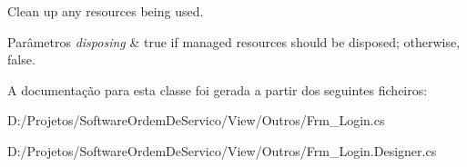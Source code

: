 Clean up any resources being used. 


\begin{DoxyParams}{Parâmetros}
{\em disposing} & true if managed resources should be disposed; otherwise, false.\\
\hline
\end{DoxyParams}


A documentação para esta classe foi gerada a partir dos seguintes ficheiros\+:\begin{DoxyCompactItemize}
\item 
D\+:/\+Projetos/\+Software\+Ordem\+De\+Servico/\+View/\+Outros/Frm\+\_\+\+Login.\+cs\item 
D\+:/\+Projetos/\+Software\+Ordem\+De\+Servico/\+View/\+Outros/Frm\+\_\+\+Login.\+Designer.\+cs\end{DoxyCompactItemize}
